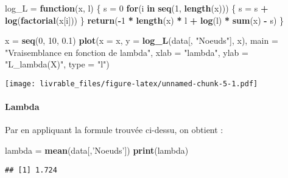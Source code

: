 \documentclass[]{article}
\newenvironment{Shaded}{\begin{snugshade}}{\end{snugshade}}
\newcommand{\KeywordTok}[1]{\textcolor[rgb]{0.13,0.29,0.53}{\textbf{#1}}}
\newcommand{\DataTypeTok}[1]{\textcolor[rgb]{0.13,0.29,0.53}{#1}}
\newcommand{\DecValTok}[1]{\textcolor[rgb]{0.00,0.00,0.81}{#1}}
\newcommand{\FloatTok}[1]{\textcolor[rgb]{0.00,0.00,0.81}{#1}}
\newcommand{\StringTok}[1]{\textcolor[rgb]{0.31,0.60,0.02}{#1}}
\newcommand{\ControlFlowTok}[1]{\textcolor[rgb]{0.13,0.29,0.53}{\textbf{#1}}}
\newcommand{\OperatorTok}[1]{\textcolor[rgb]{0.81,0.36,0.00}{\textbf{#1}}}
\newcommand{\NormalTok}[1]{#1}
\let\oldparagraph\paragraph
\renewcommand{\paragraph}[1]{\oldparagraph{#1}\mbox{}}
\begin{document}
\begin{Shaded}
\begin{Highlighting}[]
\NormalTok{log_L =}\StringTok{ }\ControlFlowTok{function}\NormalTok{(x, l) \{}
\NormalTok{  s =}\StringTok{ }\DecValTok{0}
  \ControlFlowTok{for}\NormalTok{(i }\ControlFlowTok{in} \KeywordTok{seq}\NormalTok{(}\DecValTok{1}\NormalTok{, }\KeywordTok{length}\NormalTok{(x)))}
\NormalTok{  \{}
\NormalTok{    s =}\StringTok{ }\NormalTok{s }\OperatorTok{+}\StringTok{ }\KeywordTok{log}\NormalTok{(}\KeywordTok{factorial}\NormalTok{(x[i]))}
\NormalTok{  \}}
  \KeywordTok{return}\NormalTok{(}\OperatorTok{-}\DecValTok{1} \OperatorTok{*}\StringTok{ }\KeywordTok{length}\NormalTok{(x) }\OperatorTok{*}\StringTok{ }\NormalTok{l }\OperatorTok{+}\StringTok{ }\KeywordTok{log}\NormalTok{(l) }\OperatorTok{*}\StringTok{ }\KeywordTok{sum}\NormalTok{(x) }\OperatorTok{-}\StringTok{ }\NormalTok{s)}
\NormalTok{\}}

\NormalTok{x =}\StringTok{ }\KeywordTok{seq}\NormalTok{(}\DecValTok{0}\NormalTok{, }\DecValTok{10}\NormalTok{, }\FloatTok{0.1}\NormalTok{)}
\KeywordTok{plot}\NormalTok{(}\DataTypeTok{x =}\NormalTok{ x, }
     \DataTypeTok{y =} \KeywordTok{log_L}\NormalTok{(data[, }\StringTok{"Noeuds"}\NormalTok{], x),}
     \DataTypeTok{main =} \StringTok{"Vraisemblance en fonction de lambda"}\NormalTok{,}
     \DataTypeTok{xlab =} \StringTok{"lambda"}\NormalTok{,}
     \DataTypeTok{ylab =} \StringTok{"L_lambda(X)"}\NormalTok{,}
     \DataTypeTok{type =} \StringTok{"l"}\NormalTok{)}
\end{Highlighting}
\end{Shaded}

\texttt{[image: livrable\_files/figure-latex/unnamed-chunk-5-1.pdf]}

\paragraph{Lambda}\label{lambda}

Par en appliquant la formule trouvée ci-dessu, on obtient :

\begin{Shaded}
\begin{Highlighting}[]
\NormalTok{lambda =}\StringTok{ }\KeywordTok{mean}\NormalTok{(data[,}\StringTok{'Noeuds'}\NormalTok{])}
\KeywordTok{print}\NormalTok{(lambda)}
\end{Highlighting}
\end{Shaded}

\begin{verbatim}
## [1] 1.724
\end{verbatim}
\end{document}
